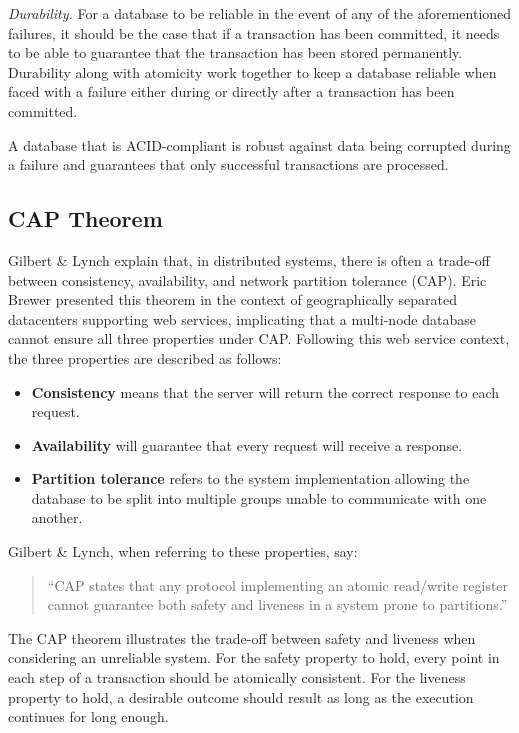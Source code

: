 \textit{Durability. }
For a database to be reliable in the event of any of the aforementioned failures, it should be the case that if a transaction has been committed, it needs to be able to guarantee that the transaction has been stored permanently. Durability along with atomicity work together to keep a database reliable when faced with a failure either during or directly after a transaction has been committed.

A database that is ACID-compliant is robust against data being corrupted during a failure and guarantees that only successful transactions are processed.

\subsection{CAP Theorem}
\label{cap}
Gilbert \& Lynch \cite{cap} explain that, in distributed systems, there is often a trade-off between consistency, availability, and network partition tolerance (CAP). Eric Brewer presented this theorem in the context of geographically separated datacenters supporting web services, implicating that a multi-node database cannot ensure all three properties under CAP. Following this web service context, the three properties are described as follows:

\begin{itemize}
    \item \textbf{Consistency} means that the server will return the correct response to each request.
    \item \textbf{Availability} will guarantee that every request will receive a response.
    \item \textbf{Partition tolerance} refers to the system implementation allowing the database to be split into multiple groups unable to communicate with one another.
\end{itemize}

Gilbert \& Lynch, when referring to these properties, say:

\begin{quote}
    ``CAP states that any protocol implementing an atomic read/write register cannot guarantee both safety and liveness in a system prone to partitions.''
\end{quote}

The CAP theorem illustrates the trade-off between safety and liveness when considering an unreliable system. For the safety property to hold, every point in each step of a transaction should be atomically consistent. For the liveness property to hold, a desirable outcome should result as long as the execution continues for long enough.

